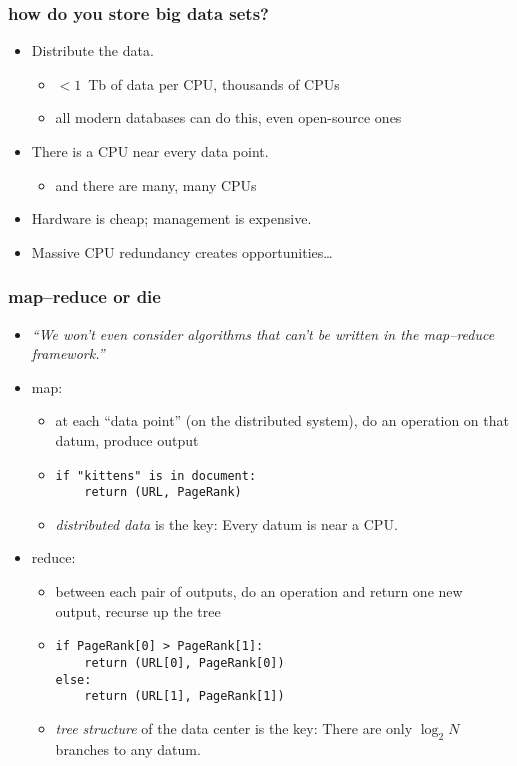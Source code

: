 \documentclass[pdftex]{beamer}
\begin{document}
\begin{frame}
  \frametitle{how do you store big data sets?}
  \begin{itemize}
  \item Distribute the data.
    \begin{itemize}
    \item $< 1$~Tb of data per CPU, thousands of CPUs
    \item all modern databases can do this, even open-source ones
    \end{itemize}
  \item There is a CPU near every data point.
    \begin{itemize}
    \item and there are many, many CPUs
    \end{itemize}
  \item Hardware is cheap; management is expensive.
  \item Massive CPU redundancy creates opportunities\ldots
  \end{itemize}
\end{frame}

\begin{frame}
  \frametitle{map--reduce or die}
  \begin{itemize}
  \item \textsl{``We won't even consider algorithms that can't be
    written in the map--reduce framework.''}
  \item map:
    \begin{itemize}
    \item at each ``data point'' (on the distributed system), do an
      operation on that datum, produce output
    \item \texttt{if "kittens" is in document: \\ ~~~~return (URL, PageRank)}
    \item \emph{distributed data} is the key: Every datum is near a
      CPU.
    \end{itemize}
  \item reduce:
    \begin{itemize}
    \item between each pair of outputs, do an operation and return one
      new output, recurse up the tree
    \item \texttt{if PageRank[0] > PageRank[1]: \\ ~~~~return (URL[0], PageRank[0]) \\ else: \\ ~~~~return (URL[1], PageRank[1])}
    \item \emph{tree structure} of the data center is the key: There are only
      $\log_2 N$ branches to any datum.
    \end{itemize}
  \end{itemize}
\end{frame}
\end{document}
